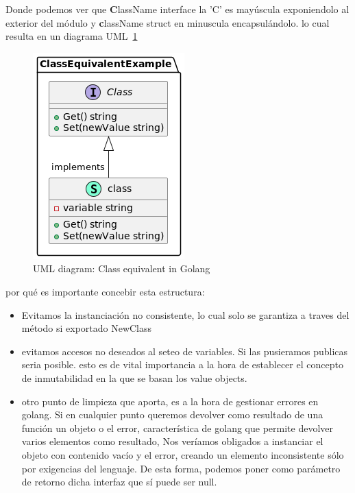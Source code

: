 Donde podemos ver que \textbf{C}lassName interface la 'C' es mayúscula exponiendolo al exterior del módulo y \textbf{c}lassName struct en minuscula encapsulándolo.
lo cual resulta en un diagrama UML~\cref{fig: uml Diagram Class Equivalent in Golang}

\begin{figure}[H]
    \centering
    \includegraphics[height=0.3\textheight]{./part/Proyecto_ejecutivo/memoria_constructiva/ClassEquivalentInGolang}
    \caption{UML diagram: Class equivalent in Golang}\label{fig: uml Diagram Class Equivalent in Golang}
\end{figure}

por qué es importante concebir esta estructura:

\begin{itemize}
    \item Evitamos la instanciación no consistente, lo cual solo se garantiza a traves del método si exportado NewClass
    \item evitamos accesos no deseados al seteo de variables. Si las pusieramos publicas seria posible. esto es de vital importancia a la hora de establecer el concepto de inmutabilidad en la que se basan los value objects.
    \item otro punto de limpieza que aporta, es a la hora de gestionar errores en golang. Si en cualquier punto queremos devolver como resultado de una función un objeto o el error, característica de golang que permite devolver varios elementos como resultado, Nos veríamos obligados a instanciar el objeto con contenido vacío y el error, creando un elemento inconsistente sólo por exigencias del lenguaje. De esta forma, podemos poner como parámetro de retorno dicha interfaz que sí puede ser null.
\end{itemize}

